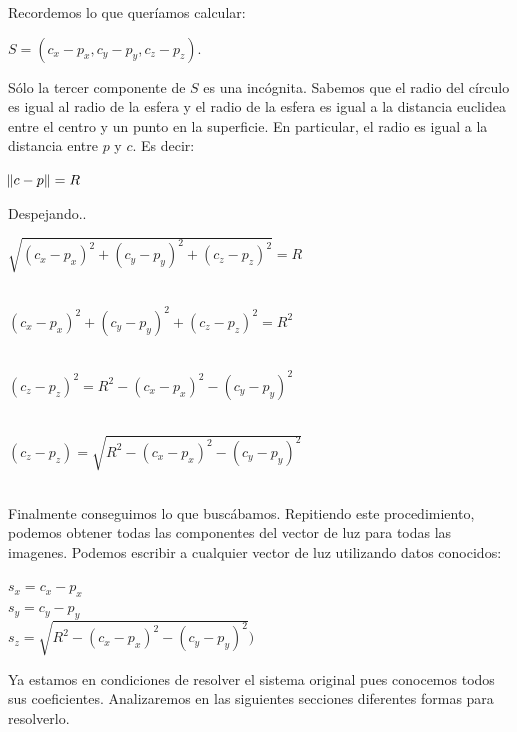 Recordemos lo que queríamos calcular:
\begin{center}
    $S = (c_{x} - p_{x}, c_{y} - p_{y}, c_{z} - p_{z}).$
\end{center}

Sólo la tercer componente de $S$ es una incógnita. Sabemos que el radio del círculo es igual al radio de la esfera y el radio de la esfera es igual a la distancia euclidea entre el centro y un punto en la superficie. En particular, el radio es igual a la distancia entre $p$ y $c$. Es decir:

\begin{center}
    $\norm{c - p} = R$ \\
\end{center}

Despejando..

\begin{center}
    $\sqrt{(c_{x} - p_{x})^{2} + (c_{y} - p_{y})^{2} + (c_{z} - p_{z})^{2}} = R$ \\ $ $

    $(c_{x} - p_{x})^{2} + (c_{y} - p_{y})^{2} + (c_{z} - p_{z})^{2} = R^{2}$ \\ $ $

    $(c_{z} - p_{z})^{2} = R^{2} - (c_{x} - p_{x})^{2} - (c_{y} - p_{y})^{2}$ \\ $ $

    $(c_{z} - p_{z}) = \sqrt{R^{2} - (c_{x} - p_{x})^{2} - (c_{y} - p_{y})^{2}}$ \\ $ $

\end{center}

Finalmente conseguimos lo que buscábamos. Repitiendo este procedimiento, podemos obtener todas las componentes del vector de luz para todas las imagenes. Podemos escribir a cualquier vector de luz utilizando datos conocidos:

\begin{center}
    $s_x = c_{x} - p_{x}$ \\
    $s_y = c_{y} - p_{y}$ \\
    $s_z = \sqrt{R^{2} - (c_{x} - p_{x})^{2} - (c_{y} - p_{y})^{2}})$ \\
\end{center}

Ya estamos en condiciones de resolver el sistema original pues conocemos todos sus coeficientes. Analizaremos en las siguientes secciones diferentes formas para resolverlo.

